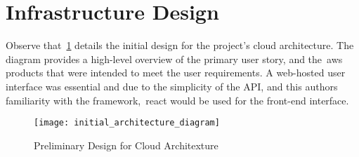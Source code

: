 \thispagestyle{plain}
\newpage
\section{Infrastructure Design}\label{sec:infrastructure-design}

\normalsize

Observe that~\ref{fig:preliminary-design} details the initial design for the project’s cloud architecture.
The diagram provides a high-level overview of the primary user story, and the~\gls{aws} products that were intended to meet the user requirements.
A web-hosted user interface was essential and due to the simplicity of the API, and this authors familiarity with the framework,~\gls{react} would be used for the front-end interface.


\begin{figure}[!htb]
    \minipage{\textwidth}
    \texttt{[image: initial\_architecture\_diagram]}
    \caption{Preliminary Design for Cloud Architexture}\label{fig:preliminary-design}
    \endminipage\hfill
\end{figure}
